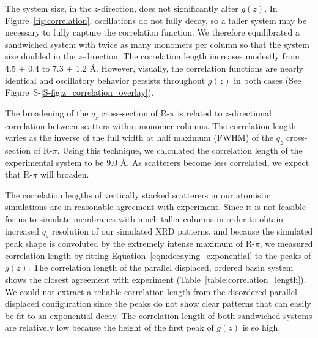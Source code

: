 \documentclass[journal=jpcbfk,manuscript=article]{achemso}
\begin{document}
  The system size, in the $z$-direction, does not significantly alter $g(z)$.
  In Figure~\ref{fig:correlation}, oscillations do not fully decay, so a taller
  system may be necessary to fully capture the correlation function. We therefore
  equilibrated a sandwiched system with twice as many monomers per column so that
  the system size doubled in the $z$-direction. The correlation length increases
  modestly from 4.5 $\pm$ 0.4 to 7.3 $\pm$ 1.2 \AA. However, visually, the
  correlation functions are nearly identical and oscillatory behavior persists
  throughout $g(z)$ in both cases (See
  Figure~S-\ref{S-fig:z_correlation_overlay}).

  The broadening of the $q_z$ cross-section of R-$\pi$ is related to
  $z$-directional correlation between scatters within monomer columns. The
  correlation length varies as the inverse of the full width at half maximum
  (FWHM) of the $q_z$ cross-section of R-$\pi$.  Using this technique, we
  calculated the correlation length of the experimental system to be 9.0 \AA. As
  scatterers become less correlated, we expect that R-$\pi$ will broaden.

  The correlation lengths of vertically stacked scatterers in our atomistic
  simulations are in reasonable agreement with experiment. Since it is not
  feasible for us to simulate membranes with much taller columns in order to
  obtain increased $q_z$ resolution of our simulated XRD patterns, and because
  the simulated peak shape is convoluted by the extremely intense maximum of
  R-$\pi$, we measured correlation length by fitting
  Equation~\ref{eqn:decaying_exponential} to the peaks of $g(z)$. The correlation
  length of the parallel displaced, ordered basin system shows the closest
  agreement with experiment (Table~\ref{table:correlation_length}). 
  We could not extract a reliable correlation length from the disordered
  parallel displaced configuration since the peaks do not show clear patterns
  that can easily be fit to an exponential decay. The correlation length of both
  sandwiched systems are relatively low because the height of the first peak of
  $g(z)$ is so high. 
  
\end{document}
